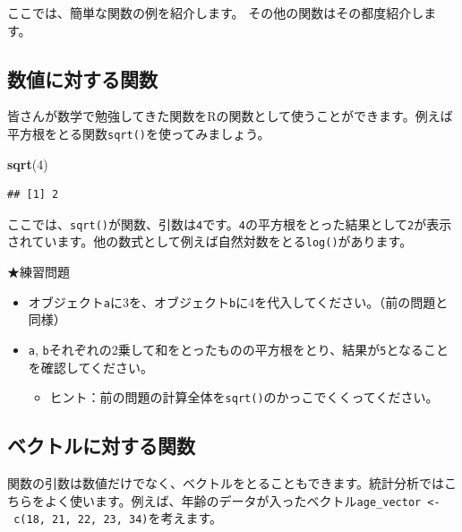 \documentclass[]{book}
\newenvironment{Shaded}{\begin{snugshade}}{\end{snugshade}}
\newcommand{\KeywordTok}[1]{\textcolor[rgb]{0.13,0.29,0.53}{\textbf{#1}}}
\newcommand{\DecValTok}[1]{\textcolor[rgb]{0.00,0.00,0.81}{#1}}
\newcommand{\NormalTok}[1]{#1}
\providecommand{\tightlist}{%
  \setlength{\itemsep}{0pt}\setlength{\parskip}{0pt}}
\begin{document}
ここでは、簡単な関数の例を紹介します。
その他の関数はその都度紹介します。

\subsection{数値に対する関数}\label{ux6570ux5024ux306bux5bfeux3059ux308bux95a2ux6570}

皆さんが数学で勉強してきた関数をRの関数として使うことができます。例えば平方根をとる関数\texttt{sqrt()}を使ってみましょう。

\begin{Shaded}
\begin{Highlighting}[]
\KeywordTok{sqrt}\NormalTok{(}\DecValTok{4}\NormalTok{)}
\end{Highlighting}
\end{Shaded}

\begin{verbatim}
## [1] 2
\end{verbatim}

ここでは、\texttt{sqrt()}が関数、引数は\texttt{4}です。\texttt{4}の平方根をとった結果として\texttt{2}が表示されています。他の数式として例えば自然対数をとる\texttt{log()}があります。

★練習問題

\begin{itemize}
\tightlist
\item
  オブジェクト\texttt{a}に3を、オブジェクト\texttt{b}に4を代入してください。（前の問題と同様）
\item
  \texttt{a},
  \texttt{b}それぞれの2乗して和をとったものの平方根をとり、結果が\texttt{5}となることを確認してください。

  \begin{itemize}
  \tightlist
  \item
    ヒント：前の問題の計算全体を\texttt{sqrt()}のかっこでくくってください。
  \end{itemize}
\end{itemize}

\subsection{ベクトルに対する関数}\label{ux30d9ux30afux30c8ux30ebux306bux5bfeux3059ux308bux95a2ux6570}

関数の引数は数値だけでなく、ベクトルをとることもできます。統計分析ではこちらをよく使います。例えば、年齢のデータが入ったベクトル\texttt{age\_vector\ \textless{}-\ c(18,\ 21,\ 22,\ 23,\ 34)}を考えます。
\end{document}
